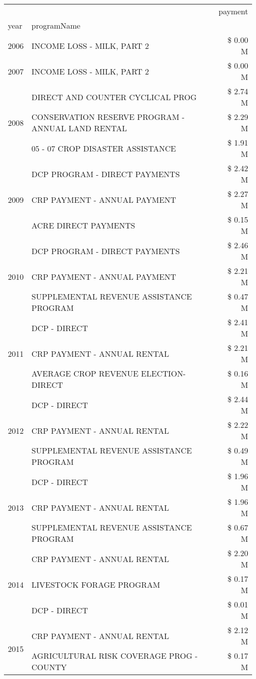 \begin{tabular}{llr}
\toprule
 &  & payment \\
year & programName &  \\
\midrule
2006 & INCOME LOSS - MILK, PART 2 & \$ 0.00 M \\
\cline{1-3}
2007 & INCOME LOSS - MILK, PART 2 & \$ 0.00 M \\
\cline{1-3}
\multirow[t]{3}{*}{2008} & DIRECT AND COUNTER CYCLICAL PROG & \$ 2.74 M \\
 & CONSERVATION RESERVE PROGRAM - ANNUAL LAND RENTAL & \$ 2.29 M \\
 & 05 - 07 CROP DISASTER ASSISTANCE & \$ 1.91 M \\
\cline{1-3}
\multirow[t]{3}{*}{2009} & DCP PROGRAM - DIRECT PAYMENTS & \$ 2.42 M \\
 & CRP PAYMENT - ANNUAL PAYMENT & \$ 2.27 M \\
 & ACRE DIRECT PAYMENTS & \$ 0.15 M \\
\cline{1-3}
\multirow[t]{3}{*}{2010} & DCP PROGRAM - DIRECT PAYMENTS & \$ 2.46 M \\
 & CRP PAYMENT - ANNUAL PAYMENT & \$ 2.21 M \\
 & SUPPLEMENTAL REVENUE ASSISTANCE PROGRAM & \$ 0.47 M \\
\cline{1-3}
\multirow[t]{3}{*}{2011} & DCP - DIRECT & \$ 2.41 M \\
 & CRP PAYMENT - ANNUAL RENTAL & \$ 2.21 M \\
 & AVERAGE CROP REVENUE ELECTION-DIRECT & \$ 0.16 M \\
\cline{1-3}
\multirow[t]{3}{*}{2012} & DCP - DIRECT & \$ 2.44 M \\
 & CRP PAYMENT - ANNUAL RENTAL & \$ 2.22 M \\
 & SUPPLEMENTAL REVENUE ASSISTANCE PROGRAM & \$ 0.49 M \\
\cline{1-3}
\multirow[t]{3}{*}{2013} & DCP - DIRECT & \$ 1.96 M \\
 & CRP PAYMENT - ANNUAL RENTAL & \$ 1.96 M \\
 & SUPPLEMENTAL REVENUE ASSISTANCE PROGRAM & \$ 0.67 M \\
\cline{1-3}
\multirow[t]{3}{*}{2014} & CRP PAYMENT - ANNUAL RENTAL & \$ 2.20 M \\
 & LIVESTOCK FORAGE PROGRAM & \$ 0.17 M \\
 & DCP - DIRECT & \$ 0.01 M \\
\cline{1-3}
\multirow[t]{3}{*}{2015} & CRP PAYMENT - ANNUAL RENTAL & \$ 2.12 M \\
 & AGRICULTURAL RISK COVERAGE PROG - COUNTY & \$ 0.17 M \\

\end{tabular}
